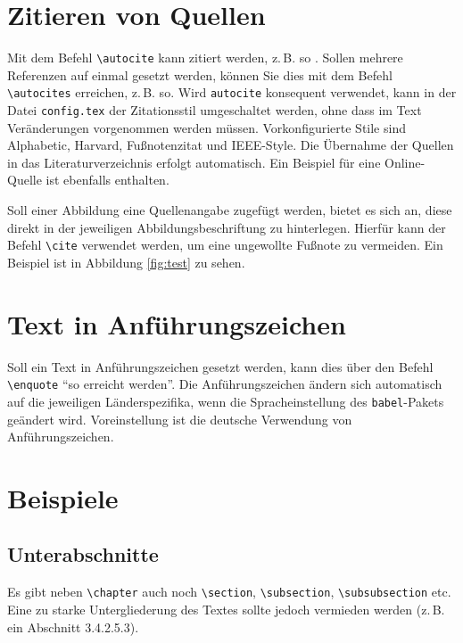 \section{Zitieren von Quellen}
Mit dem Befehl \texttt{\textbackslash autocite} kann zitiert werden, z.\,B. so \autocite[Vgl.][S. 18ff.]{ME12}. Sollen mehrere Referenzen auf einmal gesetzt werden, können Sie dies mit dem Befehl \texttt{\textbackslash autocites} erreichen, z.\,B. so\autocites[Vgl.][S. 10]{ME12}[][S. 100]{TD15}. Wird \texttt{autocite} konsequent
verwendet, kann in der Datei \texttt{config.tex} der Zitationsstil umgeschaltet werden, ohne dass im Text Veränderungen vorgenommen werden müssen. Vorkonfigurierte Stile sind Alphabetic, Harvard, Fußnotenzitat und IEEE-Style. Die Übernahme der Quellen in das Literaturverzeichnis erfolgt automatisch. Ein Beispiel für eine Online-Quelle ist ebenfalls enthalten.\autocite[Vgl.][]{TestOnlineQuelle}

Soll einer Abbildung eine Quellenangabe zugefügt werden, bietet es sich an, diese direkt in der jeweiligen Abbildungsbeschriftung zu hinterlegen. Hierfür kann der Befehl \texttt{\textbackslash cite} verwendet werden, um eine ungewollte Fußnote zu vermeiden. Ein Beispiel ist in Abbildung
\vref{fig:test} zu sehen.


\section{Text in Anführungszeichen}
Soll ein Text in Anführungszeichen gesetzt werden, kann dies über den Befehl \texttt{\textbackslash enquote} \enquote{so erreicht werden}. Die Anführungszeichen ändern sich automatisch auf die
jeweiligen Länderspezifika, wenn die Spracheinstellung des \texttt{babel}-Pakets geändert wird. Voreinstellung ist die deutsche Verwendung von
Anführungszeichen.




\section{Beispiele}
\lipsum[1]

\subsection{Unterabschnitte}
Es gibt neben \texttt{\textbackslash chapter} auch noch  \texttt{\textbackslash section}, \texttt{\textbackslash subsection}, \texttt{\textbackslash subsubsection} etc. Eine zu starke Untergliederung des Textes sollte jedoch vermieden werden (z.\,B. ein Abschnitt 3.4.2.5.3).

